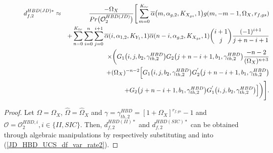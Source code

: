 \begin{proposition}
\begin{figure}[!t]
\begin{eqnarray}
d_{f,2}^{HBD(JD)*} & \approx & \frac{-\Omega_X}{Pr\big(\mathcal{O}_{2}^{HBD(JD)}\big)} \Bigg[ \sum_{m=0}^{K_{tr}} \overline{\alpha}\big(m,\alpha_{g,2},K_{X_{gs}},1\big) g(m,-m-1,\Omega_X,r_{f,gs}) \nonumber \\
 & & + \sum_{n=0}^{K_{tr}}\sum_{i=0}^{n}\sum_{j=0}^{i+1} \overline{\alpha}(i,\alpha_{1,2},K_{Y_1},1) \overline{\alpha}(n-i,\alpha_{g,2},K_{X_{gs}},1) \binom{i+1}{j} \frac{(-1)^{i+1}}{j+n-i+1} \nonumber \\
 & & \hspace{0.5cm} \times \bigg( G_1\big(i,j,b_2,\gamma_{th,2}^{HBD}\big) G_2\big(j+n-i+1,b_1,\gamma_{th,2}^{HBD}\big) \frac{-n-2}{(\Omega_X)^{n+3}} \nonumber\\
 & & \hspace{1cm} + (\Omega_X)^{-n-2} \Big[ G_1\big(i,j,b_2,\gamma_{th,2}^{HBD}\big) G_2^{'}\big(j+n-i+1,b_1,\gamma_{th,2}^{HBD}\big) \nonumber \\
 & & \hspace{2cm} + G_2\big(j+n-i+1,b_1,\gamma_{th,2}^{HBD}\big) G_1^{'}\big(i,j,b_2,\gamma_{th,2}^{HBD}\big) \Big] \bigg) \Bigg]. \label{JD_HBD_UCS_df_var_UAV2_JD}
\end{eqnarray}
\setcounter{equation}{\value{mytempeqncnt}}
\addtocounter{equation}{1}
\hrulefill
\vspace*{4pt}
\end{figure}

\end{proposition}
\begin{proof}
Let $\Omega=\Omega_X$, $\widehat{\Omega}=\widehat{\Omega}_X$ and $\gamma=\gamma_{th,2}^{HBD}=[1+\Omega_X]^{r_{f,gs}}-1$ and $\mathcal{O} = \mathcal{O}_{2}^{HBD,i}, i \in \{II,SIC\}$. Then, $d_{f,2}^{HBD(II)*}$ and $d_{f,2}^{HBD(SIC)*}$ can be obtained through algebraic manipulations by respectively substituting \cite[eq. (8)]{ernest2019outage} and \cite[eq. (10)]{ernest2019outage} into (\ref{JD_HBD_UCS_df_var_rate2}). 
\end{proof}


